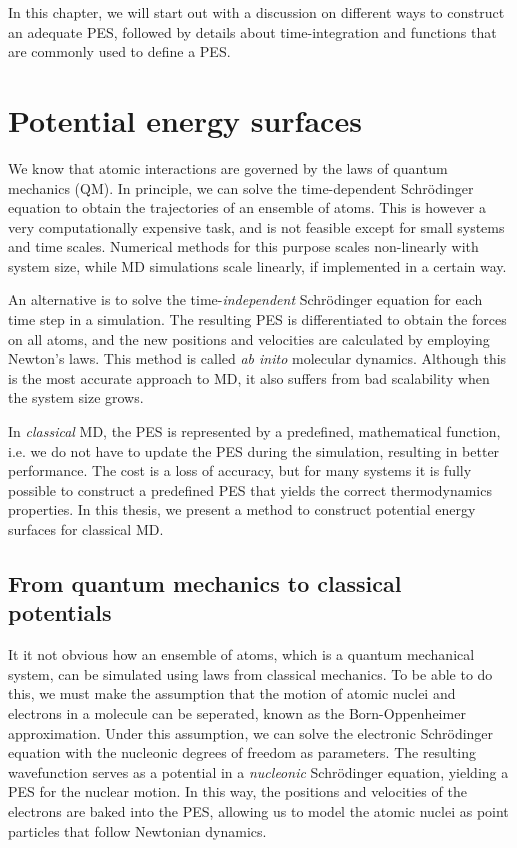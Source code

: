 \documentclass[twoside,english]{uiofysmaster}
\begin{document}
In this chapter, we will start out with a discussion on different ways to construct an adequate PES, followed 
by details about time-integration and functions that are commonly used to define a PES. 

\section{Potential energy surfaces} \label{sec:potentialEnergySurfaces}
We know that atomic interactions are governed by the laws of quantum mechanics (QM). 
In principle, we can solve the time-dependent Schr\"{o}dinger equation to obtain the trajectories of 
an ensemble of atoms. This is however a very computationally expensive task, and is not feasible except for
small systems and time scales. Numerical methods for this purpose scales non-linearly with system size, while
MD simulations scale linearly, if implemented in a certain way. 

An alternative is to solve the time-\textit{independent} Schr\"{o}dinger equation for each time step in a simulation. 
The resulting PES is differentiated to obtain the forces on all atoms, and the new positions and velocities are calculated
by employing Newton's laws. This method is called \textit{ab inito} molecular dynamics. Although this is the most accurate
approach to MD, it also suffers from bad scalability when the system size grows. 

In \textit{classical} MD, the PES is represented by a predefined, mathematical function, i.e. we do not have to 
update the PES during the simulation, resulting in better performance. The cost is a loss of accuracy, but for many 
systems it is fully possible to construct a predefined PES that yields the correct thermodynamics properties. 
In this thesis, we present a method to construct potential energy surfaces for classical MD.  

\subsection{From quantum mechanics to classical potentials} \label{sec:bornOppenheimer}
It it not obvious how an ensemble of atoms, which is a quantum mechanical system, can be simulated using 
laws from classical mechanics. To be able to do this,
we must make the assumption that the motion of atomic nuclei and electrons in a molecule
can be seperated, known as the Born-Oppenheimer approximation. 
Under this assumption, we can solve the electronic Schr\"{o}dinger equation with the nucleonic degrees of freedom as parameters.
The resulting wavefunction serves as a potential in a \textit{nucleonic} Schr\"{o}dinger equation, yielding a PES 
for the nuclear motion. In this way, the positions and velocities of the electrons are baked into the PES, 
allowing us to model the atomic nuclei as point particles that follow Newtonian dynamics. 
\end{document}
